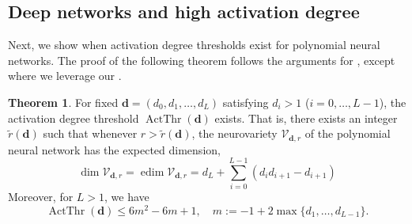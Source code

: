 \documentclass[12pt]{article}
\theoremstyle{definition}
\newtheorem{theorem}{Theorem}
\DeclareMathOperator{\ActThr}{ActThr}
\newcommand{\bfd}{\mathbf{d}}
\newcommand{\upperboundn}[1]{6{#1}^2-6#1+1}
\newcommand{\edimLHS}{d_L+\sum_{i=0}^{L-1}(d_id_{i+1}-d_{i+1})}
\newcommand{\edim}[1]{\operatorname{edim}{#1}}
\renewcommand{\dim}[1]{\operatorname{dim}{#1}}
\begin{document}
\subsection{Deep networks and high activation degree}\label{ss:deep-high-degree}

Next, we show when activation degree thresholds exist for polynomial neural networks. The proof of the following theorem follows the arguments for \cite[Theorem 14]{KTB2019}, except where we leverage our .




\begin{theorem}\label{theorem:high-degree}
For fixed $\mathbf{d} = (d_0,d_1,\dotsc,d_L)$ satisfying $d_i>1$ ($i=0,\dotsc,L-1$),
the activation degree threshold $\ActThr(\mathbf{d})$ exists. 
That is, there exists an integer $\tilde{r}(\bfd)$ such that whenever $r>\tilde{r}(\bfd)$, the neurovariety $\mathcal{V}_{\mathbf{d},r}$ of the polynomial neural network has the expected dimension, 
\begin{equation}\label{edim_at_threshold}
\dim{\mathcal{V}_{\mathbf{d},r}} = \edim{\mathcal{V}_{\mathbf{d},r}} = \edimLHS
\end{equation}
Moreover,
for $L>1$,
we have 
\begin{equation}\label{eq:universal-bound-in-theorem}
\ActThr(\mathbf{d}) \le 
\upperboundn{m},
\quad m:=-1+2\max\{d_1, \dots, d_{L-1}\} .
\end{equation}

\end{theorem}
\end{document}
